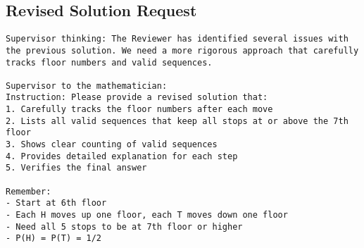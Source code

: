 \subsection{Revised Solution Request}
\vspace{-0.5em}
\begin{supervisorbox}
\begin{lstlisting}
Supervisor thinking: The Reviewer has identified several issues with the previous solution. We need a more rigorous approach that carefully tracks floor numbers and valid sequences.

Supervisor to the mathematician:
Instruction: Please provide a revised solution that:
1. Carefully tracks the floor numbers after each move
2. Lists all valid sequences that keep all stops at or above the 7th floor
3. Shows clear counting of valid sequences
4. Provides detailed explanation for each step
5. Verifies the final answer

Remember:
- Start at 6th floor
- Each H moves up one floor, each T moves down one floor
- Need all 5 stops to be at 7th floor or higher
- P(H) = P(T) = 1/2

\end{lstlisting}
\end{supervisorbox}

